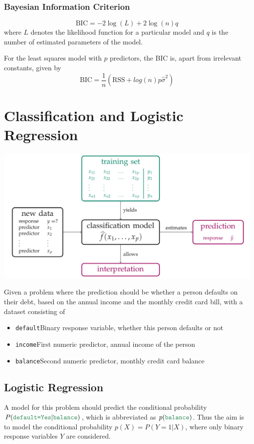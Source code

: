 \documentclass[11pt]{article}
\newcommand*\predvar[1]{{\color{SeaGreen4} \texttt{#1}}}
\begin{document}
\subsubsection{Bayesian Information Criterion}
\begin{equation*}
	\text{BIC} = -2\log(L) + 2\log(n)q
\end{equation*}
where $L$ denotes the likelihood function for a particular model and $q$ is the number of estimated parameters of the model.

For the least squares model with $p$ predictors, the BIC is, apart from irrelevant constants, given by
\begin{equation*}
	\text{BIC} = \frac{1}{n}\left( \text{RSS} + log(n)p\hat{\sigma}^2 \right)
\end{equation*}

\section{Classification and Logistic Regression}
\begin{center}
	\includegraphics[width=0.6\linewidth]{img/classification}
\end{center}

Given a problem where the prediction should be whether a person defaults on their debt, based on the annual income and the monthly credit card bill, with a dataset consisting of
\begin{itemize}
	\item \predvar{default}\qquad Binary response variable, whether this person defaults or not
	\item \predvar{income}\qquad First numeric predictor, annual income of the person
	\item \predvar{balance}\qquad Second numeric predictor, monthly credit card balance
\end{itemize}

\subsection{Logistic Regression}
A model for this problem should predict the conditional probability $P(\predvar{default=Yes}|\predvar{balance})$, which is abbreviated as $p(\predvar{balance})$. Thus the aim is to model the conditional probability $p(X) = P(Y=1|X)$, where only binary response variables $Y$ are considered.
\end{document}
